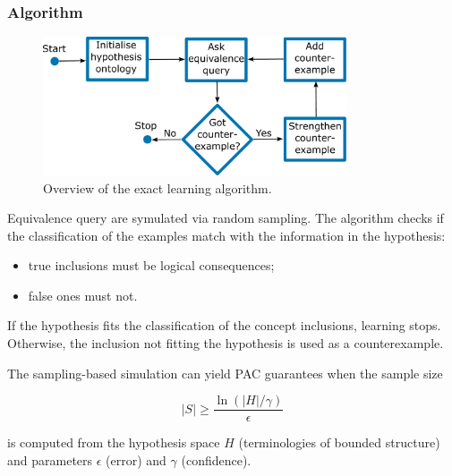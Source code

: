 \documentclass[handout]{beamer}\mode<handout>{\usetheme{AMSBolognaFC}}
\begin{document}
\begin{frame}[c, allowframebreaks]
\frametitle{Algorithm}

    \begin{figure}
        \centering
        \includegraphics[width=0.8\textwidth]{figures/algorithm}
        \caption{Overview of the exact learning algorithm.}
        \label{fig:algorithm}
    \end{figure}

    \framebreak


    Equivalence query are \alert{symulated} via random \alert{sampling}.
    The algorithm checks if the classification of the examples match with the information in the hypothesis:

    \begin{itemize}
        \item true inclusions must be \alert{logical consequences};
        \item false ones must not.
    \end{itemize}


    If the hypothesis fits the classification of the concept inclusions, learning stops.
    Otherwise, the inclusion not fitting the hypothesis is used as a \alert{counterexample}.


    \framebreak

    The sampling-based simulation can yield \alert{PAC}  guarantees when the sample size

    \begin{equation*}
        \lvert S \rvert \geq \frac{\ln\left(\lvert H \rvert / \gamma\right)}{\epsilon}
    \end{equation*}

    is computed from the hypothesis space $H$ (\EL terminologies of bounded structure) and parameters $\epsilon$ (error) and $\gamma$ (confidence).


\end{frame}
\end{document}
